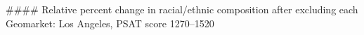 #### Relative percent change in racial/ethnic composition after excluding each Geomarket: Los Angeles, PSAT score 1270–1520
